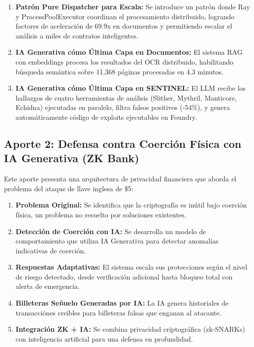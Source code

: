 \documentclass[12pt,a4paper,twoside]{book}
\begin{document}
\begin{enumerate}[label=\textbf{1.\arabic*.}]
    \item \textbf{Patrón Pure Dispatcher para Escala:} Se introduce un patrón donde Ray y ProcessPoolExecutor coordinan el procesamiento distribuido, logrando factores de aceleración de 69.9x en documentos y permitiendo escalar el análisis a miles de contratos inteligentes.
    
    \item \textbf{IA Generativa cómo Última Capa en Documentos:} El sistema RAG con embeddings procesa los resultados del OCR distribuido, habilitando búsqueda semántica sobre 11,368 páginas procesadas en 4.3 minutos.
    
    \item \textbf{IA Generativa cómo Última Capa en SENTINEL:} El LLM recibe los hallazgos de cuatro herramientas de análisis (Slither, Mythril, Manticore, Echidna) ejecutadas en paralelo, filtra falsos positivos (-54\%), y genera automáticamente código de exploits ejecutables en Foundry.
\end{enumerate}

\subsection{Aporte 2: Defensa contra Coerción Física con IA Generativa (ZK Bank)}

Este aporte presenta una arquitectura de privacidad financiera que aborda el problema del ataque de llave inglesa de \$5:

\begin{enumerate}[label=\textbf{2.\arabic*.}]
    \item \textbf{Problema Original:} Se identifica que la criptografía es inútil bajo coerción física, un problema no resuelto por soluciones existentes.
    
    \item \textbf{Detección de Coerción con IA:} Se desarrolla un modelo de comportamiento que utiliza IA Generativa para detectar anomalías indicativas de coerción.
    
    \item \textbf{Respuestas Adaptativas:} El sistema escala sus protecciones según el nivel de riesgo detectado, desde verificación adicional hasta bloqueo total con alerta de emergencia.
    
    \item \textbf{Billeteras Señuelo Generadas por IA:} La IA genera historiales de transacciónes creíbles para billeteras falsas que enganan al atacante.
    
    \item \textbf{Integración ZK + IA:} Se combina privacidad criptográfica (zk-SNARKs) con inteligencia artificial para una defensa en profundidad.
\end{enumerate}
\end{document}
